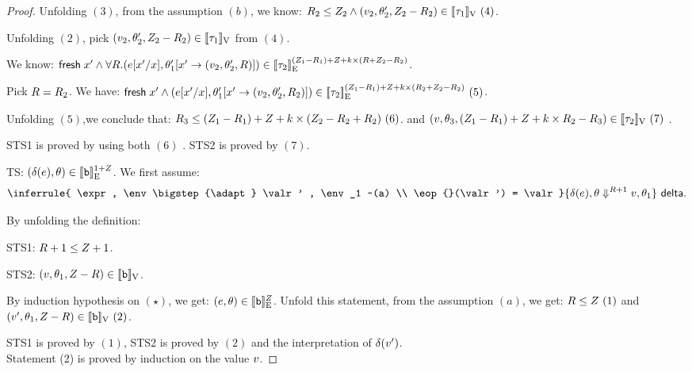 \begin{proof}
Unfolding $(3)$, from the assumption $(b)$, we know: $\adapt_2 \leq \nnatA_2 \land (\valr_2, \env_2', \nnatA_2-\adapt_2) \in \lrv{\type_1} ~(4)$.

Unfolding $(2)$,  pick $(\valr_2, \env_2', \nnatA_2 - \adapt_2 ) \in
\lrv{\type_1} $ from $(4)$.

We know: $ \fresh \eapp x' \land \forall \adapt.  (
\expr[x'/x], \env_1'[ x'  \to (\valr_2, \env_2', \adapt  ) ]  ) \in
\lre{}{ (\nnatA_1- \adapt_1) + \nnatA+\idx\times (\adapt+ \nnatA_2 -\adapt_2  ) }{\type_2} $.

Pick $\adapt = \adapt_2$.
We have: $ \fresh \eapp x' \land  (
\expr[x'/x], \env_1'[ x'  \to (\valr_2, \env_2', \adapt_2  ) ]  ) \in
\lre{}{ (\nnatA_1- \adapt_1) + \nnatA+\idx\times ( \adapt_2 + \nnatA_2
  - \adapt_2)   }{\type_2}
~(5) $.

Unfolding $(5)$,we conclude that: $ \adapt_3 \leq (\nnatA_1 -
\adapt_1) + \nnatA +\idx\times
(\nnatA_2  - \adapt_2 +\adapt_2)~(6)$.  and $(\valr, \env_3,   (\nnatA_1- \adapt_1) +
\nnatA+\idx\times \adapt_2 - \adapt_3 ) \in \lrv{\type_2} ~(7) $ .

STS1 is proved by using both $(6)$ .  STS2 is proved by $(7)$. \\


 TS: $(\delta(\expr), \env ) \in  \lre{}{ 1+ \nnatA}{ \tbase }$.
 We first assume:
 \[ \inferrule{
    \expr , \env \bigstep{\adapt} \valr' , \env_1 ~(a) \\
    \eop{}(\valr') = \valr
  }{
    \eop(\expr), \env \bigstep{\adapt +1} \valr,  \env_1
  }~\textsf{delta}.
  \]

  By unfolding the definition:

  STS1: $\adapt+1 \leq \nnatA +1$.
  
STS2: $ (\valr, \env_1, \nnatA- \adapt) \in \lrv{\tbase} $.

By induction hypothesis on $(\star)$, we get: $ (\expr, \env) \in \lre{}{\nnatA}{\tbase} $.
Unfold this statement, from the assumption $(a)$, we get: $ \adapt \leq \nnatA~(1) $ and $ (\valr', \env_1, \nnatA-\adapt)  \in \lrv{\tbase}~(2)$.

STS1 is proved by $(1)$,  STS2 is proved by $(2)$ and the
interpretation of $\delta(\valr')$. \\


Statement (2) is proved by induction on the value $\valr$.



\end{proof}
